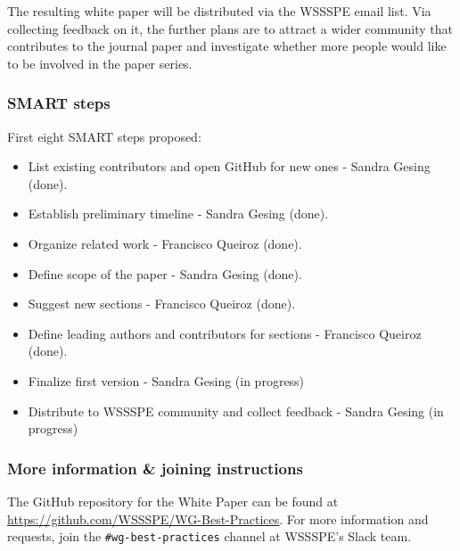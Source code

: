 The resulting white paper will be distributed via the WSSSPE email list. Via collecting feedback on it, the further plans are to attract a wider community that contributes to the journal paper and investigate whether more people would like to be involved in the paper series.

\subsubsection{SMART steps}

First eight SMART steps proposed: \\
\begin{itemize}
\item List existing contributors and open GitHub for new ones - Sandra Gesing (done).
\item Establish preliminary timeline  - Sandra Gesing (done).
\item Organize related work - Francisco Queiroz (done).
\item Define scope of the paper - Sandra Gesing (done).
\item Suggest new sections - Francisco Queiroz (done).
\item Define leading authors and contributors for sections - Francisco Queiroz (done).
\item Finalize first version - Sandra Gesing (in progress)
\item Distribute to WSSSPE community and collect feedback - Sandra Gesing (in progress)
\end{itemize}

\subsubsection{More information \& joining instructions}

The GitHub repository for the White Paper can be found at \url{https://github.com/WSSSPE/WG-Best-Practices}. For more information and requests, join the \texttt{\#wg-best-practices} channel at WSSSPE's Slack team.
